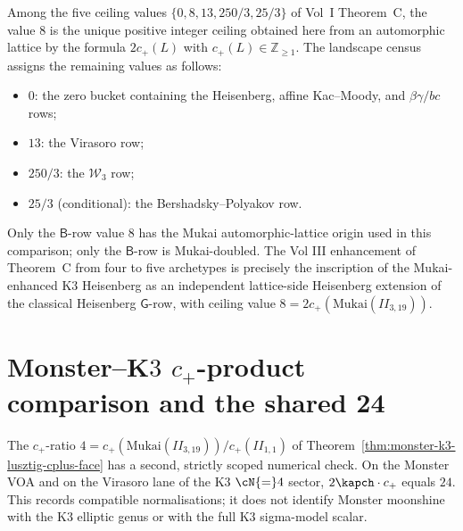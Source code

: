 \begin{remark}[$K^\kappa = 8$ on the $\mathsf B$-row is the
Mukai-doubled positive ceiling]
\label{rem:as-Kkappa-8-unique-Mukai-doubled}
%
Among the five ceiling values $\{0, 8, 13, 250/3, 25/3\}$ of
Vol~I Theorem~C, the value $8$ is the unique positive integer ceiling
obtained here from an automorphic lattice by the formula
$2c_+(L)$ with $c_+(L)\in\mathbb Z_{\ge 1}$. The landscape census
assigns the remaining values as follows:
\begin{itemize}
\item $0$: the zero bucket containing the Heisenberg, affine
 Kac--Moody, and $\beta\gamma/bc$ rows;
\item $13$: the Virasoro row;
\item $250/3$: the $\mathcal W_3$ row;
\item $25/3$ (conditional): the Bershadsky--Polyakov row.
\end{itemize}
Only the $\mathsf B$-row value $8$ has the Mukai automorphic-lattice
origin used in this comparison;
only the $\mathsf B$-row is Mukai-doubled. The Vol III enhancement
of Theorem~C from four to five archetypes is precisely the
inscription of the Mukai-enhanced K$3$ Heisenberg as an independent
lattice-side Heisenberg extension of the classical Heisenberg
$\mathsf G$-row, with ceiling value $8 = 2 c_+(\mathrm{Mukai}(II_{3, 19}))$.
\end{remark}

\section{Monster--K$3$ $c_+$-product comparison and the shared 24}
\label{sec:monster-k3-cplus-product-invariant}

The $c_+$-ratio $4 = c_+(\mathrm{Mukai}(II_{3, 19}))/c_+(II_{1, 1})$
of Theorem~\ref{thm:monster-k3-lusztig-cplus-face} has a second,
strictly scoped numerical check. On the Monster VOA and on the
Virasoro lane of the K$3$ $\cN{=}4$ sector, $2\kapch\cdot c_+$
equals $24$. This records compatible normalisations; it does not
identify Monster moonshine with the K$3$ elliptic genus or with the
full K$3$ sigma-model scalar.

